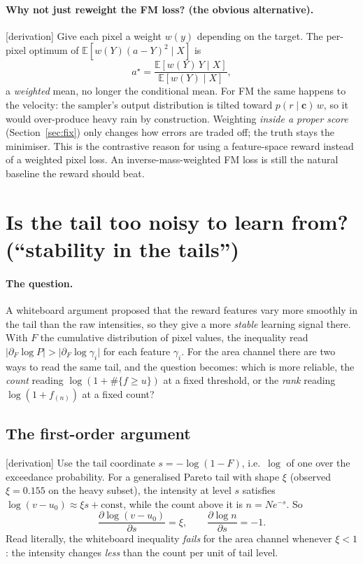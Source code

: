 \documentclass[11pt,a4paper]{article}
\newcommand{\E}{\mathbb{E}}
\newcommand{\status}[1]{\textsf{\small[#1]}}
\begin{document}
\paragraph{Why not just reweight the FM loss? (the obvious alternative).} \status{derivation} Give each pixel a weight
$w(y)$ depending on the target. The per-pixel optimum of $\E[w(Y)(a-Y)^2\mid X]$ is
\begin{equation}
  a^\star = \frac{\E[w(Y)\,Y\mid X]}{\E[w(Y)\mid X]},
\end{equation}
a \emph{weighted} mean, no longer the conditional mean. For FM the same happens to the velocity: the sampler's output
distribution is tilted toward $p(r\mid\mathbf c)\,w$, so it would over-produce heavy rain by construction. Weighting
\emph{inside a proper score} (Section~\ref{sec:fix}) only changes how errors are traded off; the truth stays the
minimiser. This is the contrastive reason for using a feature-space reward instead of a weighted pixel loss. An
inverse-mass-weighted FM loss is still the natural baseline the reward should beat.

\section{Is the tail too noisy to learn from? (``stability in the tails'')}\label{sec:stability}

\paragraph{The question.} A whiteboard argument proposed that the reward features vary more smoothly in the tail than
the raw intensities, so they give a more \emph{stable} learning signal there. With
$F$ the cumulative distribution of pixel values, the inequality read
$\big|\partial_{F}\log P\big| > \big|\partial_{F}\log\gamma_i\big|$ for each feature $\gamma_i$. For the area channel
there are two ways to read the same tail, and the question becomes: which is more reliable, the \emph{count} reading
$\log(1+\#\{f\ge u\})$ at a fixed threshold, or the \emph{rank} reading $\log(1+f_{(n)})$ at a fixed count?

\subsection{The first-order argument}
\status{derivation} Use the tail coordinate $s = -\log(1-F)$, i.e.\ $\log$ of one over the exceedance probability.
For a generalised Pareto tail with shape $\xi$ (observed $\xi = 0.155$ on the heavy subset), the intensity at level $s$
satisfies $\log(v - u_0) \approx \xi s + \text{const}$, while the count above it is $n = N e^{-s}$. So
\begin{equation}
  \frac{\partial \log(v-u_0)}{\partial s} = \xi,\qquad \frac{\partial \log n}{\partial s} = -1 .
\end{equation}
Read literally, the whiteboard inequality \emph{fails} for the area channel whenever $\xi < 1$: the intensity changes
\emph{less} than the count per unit of tail level.
\end{document}
